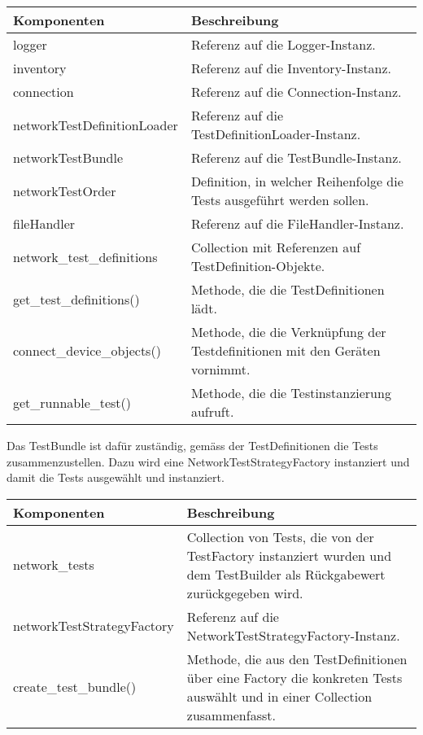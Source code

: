\documentclass[]{subfiles}
\begin{document}
	\begin{tabularx}{\textwidth}{lX}
		\toprule
			Komponenten & Beschreibung \\
		\midrule
			logger & Referenz auf die Logger-Instanz.  \\
			inventory & Referenz auf die Inventory-Instanz. \\
			connection & Referenz auf die Connection-Instanz. \\
			networkTestDefinitionLoader & Referenz auf die TestDefinitionLoader-Instanz.\\
			networkTestBundle &  Referenz auf die TestBundle-Instanz. \\
			networkTestOrder & Definition, in welcher Reihenfolge die Tests ausgeführt werden sollen. \\
			fileHandler & Referenz auf die FileHandler-Instanz. \\
			network\_test\_definitions & Collection mit Referenzen auf TestDefinition-Objekte. \\
		\midrule
			get\_test\_definitions() & Methode, die die TestDefinitionen lädt. \\
			connect\_device\_objects() & Methode, die die Verknüpfung der Testdefinitionen mit den Geräten vornimmt. \\
			get\_runnable\_test() & Methode, die die Testinstanzierung aufruft. \\
		\bottomrule
	\end{tabularx}
	\newpage

	Das TestBundle ist dafür zuständig, gemäss der TestDefinitionen die Tests zusammenzustellen. 
	Dazu wird eine NetworkTestStrategyFactory instanziert und damit die Tests ausgewählt und instanziert.

	\begin{tabularx}{\textwidth}{lX}
		\toprule
			Komponenten & Beschreibung \\
		\midrule
			network\_tests & Collection von Tests, die von der TestFactory instanziert wurden und dem TestBuilder als Rückgabewert zurückgegeben wird. \\
			networkTestStrategyFactory & Referenz auf die NetworkTestStrategyFactory-Instanz. \\
		\midrule
			create\_test\_bundle() & Methode, die aus den TestDefinitionen über eine Factory die konkreten Tests auswählt und in einer Collection zusammenfasst. \\
		\bottomrule
	\end{tabularx}
\end{document}
